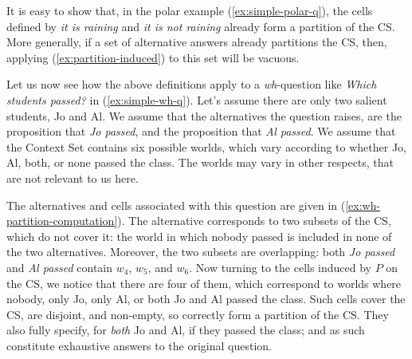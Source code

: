 It is easy to show that, in the polar example (\ref{ex:simple-polar-q}), the cells defined by \textit{it is raining} and \textit{it is not raining} already form a partition of the CS. More generally, if a set of alternative answers already partitions the CS, then, applying (\ref{ex:partition-induced}) to this set will be vacuous.


Let us now see how the above definitions apply to a \textit{wh}-question like \textit{Which students passed?} in (\ref{ex:simple-wh-q}). Let's assume there are only two salient students, Jo and Al. We assume that the alternatives the question raises, are the proposition that \textit{Jo passed}, and the proposition that \textit{Al passed}. We assume that the Context Set contains six possible worlds, which vary according to whether Jo, Al, both, or none passed the class. The worlds may vary in other respects, that are not relevant to us here.

The alternatives and cells associated with this question are given in (\ref{ex:wh-partition-computation}). The alternative corresponds to two subsets of the CS, which do not cover it: the world in which nobody passed is included in none of the two alternatives. Moreover, the two subsets are overlapping: both \textit{Jo passed} and \textit{Al passed} contain $w_4$, $w_5$, and $w_6$. Now turning to the cells induced by $P$ on the CS, we notice that there are four of them, which correspond to worlds where nobody, only Jo, only Al, or both Jo and Al passed the class. Such cells cover the CS, are disjoint, and non-empty, so correctly form a partition of the CS. They also fully specify, for \textit{both} Jo and Al, if they passed the class; and as such constitute exhaustive answers to the original question.

\begin{exe}
	\label{ex:wh-partition-computation}
\end{exe}


